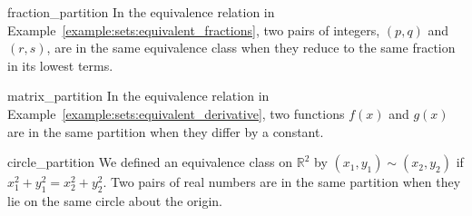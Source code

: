 \medskip
 
\begin{example}{fraction_partition}
In the equivalence relation in Example~\ref{example:sets:equivalent_fractions}, two pairs of integers, $(p,q)$ and $(r,s)$, are in the same equivalence class when they reduce to the same fraction in its lowest terms.  
\end{example}
 
\begin{example}{matrix_partition}
In the equivalence relation in Example~\ref{example:sets:equivalent_derivative}, two functions $f(x)$ and $g(x)$ are in the same partition when they differ by a constant.  
\end{example}

\begin{example}{circle_partition}
We defined an equivalence class on ${\mathbb R}^2$ by $(x_1, y_1 ) \sim (x_2, y_2)$ if $x_1^2 + y_1^2 = x_2^2 + y_2^2$.  Two pairs of real numbers are in the same partition when they lie on the same circle about the origin. 
\end{example}
 
